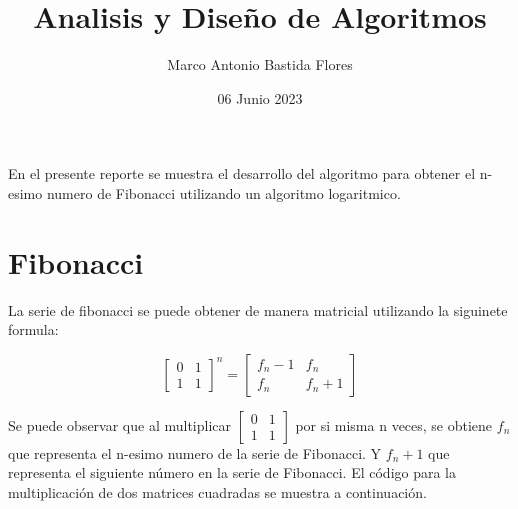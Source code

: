 \documentclass{article}
\title{Analisis y Diseño de Algoritmos}
\author{Marco Antonio Bastida Flores}
\date{06 Junio 2023}
\begin{document}
\maketitle

En el presente reporte se muestra el desarrollo del algoritmo para obtener el n-esimo numero de Fibonacci utilizando un algoritmo logaritmico.

\section{Fibonacci}

La serie de fibonacci se puede obtener de manera matricial utilizando la siguinete formula:

\vspace{5mm} %

\begin{displaymath}
    \begin{bmatrix}
        0 & 1 \\
        1 & 1 
    \end{bmatrix}^n
=
    \begin{bmatrix}
        f_n-1 & f_n \\
        f_n & f_n+1 
    \end{bmatrix}
\end{displaymath}

\vspace{5mm} %

Se puede observar que al multiplicar 
\begin{math}
    \begin{bmatrix}
        0 & 1 \\
        1 & 1 
    \end{bmatrix}
\end{math}
por si misma n veces, se obtiene 
\begin{math}
    f_n
\end{math}
que representa el n-esimo numero de la serie de Fibonacci. Y 
\begin{math}
    f_n+1
\end{math}
que representa el siguiente número en la serie de Fibonacci. \newline
El código para la multiplicación de dos matrices cuadradas se muestra a continuación.

\vspace{5mm} %


\end{document}
